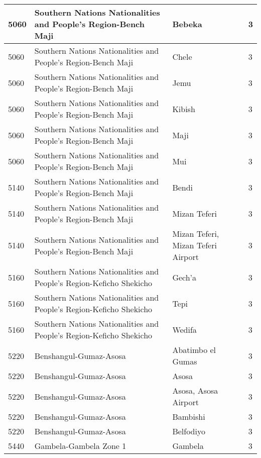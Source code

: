 \documentclass[12pt,a4paper,openbib,titlepage]{report}
\begin{document}
\begin{longtable}{|p{2cm}|p{6.5cm}|p{8cm}|p{1.5cm}|}
\hline 
\rule[-1ex]{0pt}{2.5ex} 5060 & Southern Nations Nationalities and People's Region-Bench Maji & Bebeka & 3 \\
\hline 
\rule[-1ex]{0pt}{2.5ex} 5060 & Southern Nations Nationalities and People's Region-Bench Maji & Chele & 3 \\
\hline 
\rule[-1ex]{0pt}{2.5ex} 5060 & Southern Nations Nationalities and People's Region-Bench Maji & Jemu & 3 \\
\hline 
\rule[-1ex]{0pt}{2.5ex} 5060 & Southern Nations Nationalities and People's Region-Bench Maji & Kibish & 3 \\
\hline 
\rule[-1ex]{0pt}{2.5ex} 5060 & Southern Nations Nationalities and People's Region-Bench Maji & Maji & 3 \\
\hline 
\rule[-1ex]{0pt}{2.5ex} 5060 & Southern Nations Nationalities and People's Region-Bench Maji & Mui & 3 \\
\hline 
\rule[-1ex]{0pt}{2.5ex} 5140 & Southern Nations Nationalities and People's Region-Bench Maji & Bendi & 3 \\
\hline 
\rule[-1ex]{0pt}{2.5ex} 5140 & Southern Nations Nationalities and People's Region-Bench Maji & Mizan Teferi & 3 \\
\hline 
\rule[-1ex]{0pt}{2.5ex} 5140 & Southern Nations Nationalities and People's Region-Bench Maji & Mizan Teferi, Mizan Teferi Airport & 3 \\
\hline 
\rule[-1ex]{0pt}{2.5ex} 5160 & Southern Nations Nationalities and People's Region-Keficho Shekicho & Gech'a & 3 \\
\hline 
\rule[-1ex]{0pt}{2.5ex} 5160 & Southern Nations Nationalities and People's Region-Keficho Shekicho & Tepi & 3 \\
\hline 
\rule[-1ex]{0pt}{2.5ex} 5160 & Southern Nations Nationalities and People's Region-Keficho Shekicho & Wedifa & 3 \\
\hline 
\rule[-1ex]{0pt}{2.5ex} 5220 & Benshangul-Gumaz-Asosa & Abatimbo el Gumas & 3 \\
\hline 
\rule[-1ex]{0pt}{2.5ex} 5220 & Benshangul-Gumaz-Asosa & Asosa & 3 \\
\hline 
\rule[-1ex]{0pt}{2.5ex} 5220 & Benshangul-Gumaz-Asosa & Asosa, Asosa Airport & 3 \\
\hline 
\rule[-1ex]{0pt}{2.5ex} 5220 & Benshangul-Gumaz-Asosa & Bambishi & 3 \\
\hline 
\rule[-1ex]{0pt}{2.5ex} 5220 & Benshangul-Gumaz-Asosa & Belfodiyo & 3 \\
\hline 
\rule[-1ex]{0pt}{2.5ex} 5440 & Gambela-Gambela Zone 1 & Gambela & 3 \\

\end{longtable}
\end{document}
